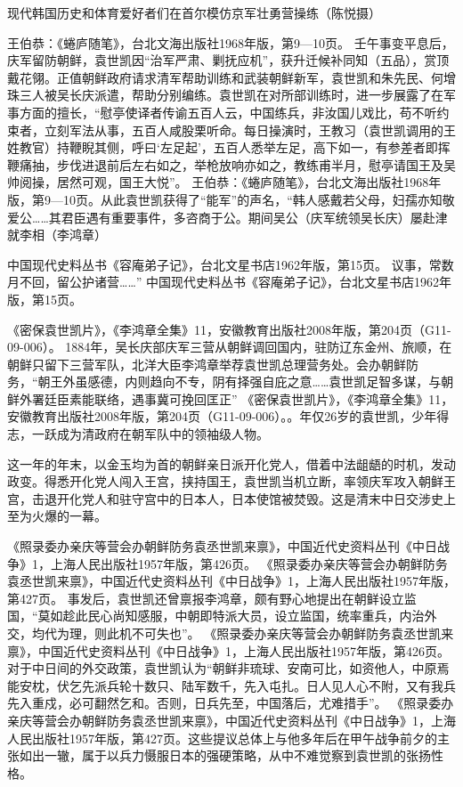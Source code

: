 \documentclass[12pt,UTF8]{ctexbook}
\begin{document}
现代韩国历史和体育爱好者们在首尔模仿京军壮勇营操练（陈悦摄）

王伯恭：《蜷庐随笔》，台北文海出版社1968年版，第9—10页。
壬午事变平息后，庆军留防朝鲜，袁世凯因“治军严肃、剿抚应机”，获升迁候补同知（五品），赏顶戴花翎。正值朝鲜政府请求清军帮助训练和武装朝鲜新军，袁世凯和朱先民、何增珠三人被吴长庆派遣，帮助分别编练。袁世凯在对所部训练时，进一步展露了在军事方面的擅长，“慰亭使译者传谕五百人云，中国练兵，非汝国儿戏比，苟不听约束者，立刻军法从事，五百人咸股栗听命。每日操演时，王教习（袁世凯调用的王姓教官）持鞭睨其侧，呼曰‘左足起’，五百人悉举左足，高下如一，有参差者即挥鞭痛抽，步伐进退前后左右如之，举枪放响亦如之，教练甫半月，慰亭请国王及吴帅阅操，居然可观，国王大悦”。 王伯恭：《蜷庐随笔》，台北文海出版社1968年版，第9—10页。从此袁世凯获得了“能军”的声名，“韩人感戴若父母，妇孺亦知敬爱公……其君臣遇有重要事件，多咨商于公。期间吴公（庆军统领吴长庆）屡赴津就李相（李鸿章）

中国现代史料丛书《容庵弟子记》，台北文星书店1962年版，第15页。
议事，常数月不回，留公护诸营……” 中国现代史料丛书《容庵弟子记》，台北文星书店1962年版，第15页。

《密保袁世凯片》，《李鸿章全集》11，安徽教育出版社2008年版，第204页（G11-09-006）。
1884年，吴长庆部庆军三营从朝鲜调回国内，驻防辽东金州、旅顺，在朝鲜只留下三营军队，北洋大臣李鸿章举荐袁世凯总理营务处。会办朝鲜防务，“朝王外虽感德，内则趋向不专，阴有择强自庇之意……袁世凯足智多谋，与朝鲜外署廷臣素能联络，遇事冀可挽回匡正” 《密保袁世凯片》，《李鸿章全集》11，安徽教育出版社2008年版，第204页（G11-09-006）。。年仅26岁的袁世凯，少年得志，一跃成为清政府在朝军队中的领袖级人物。

这一年的年末，以金玉均为首的朝鲜亲日派开化党人，借着中法龃龉的时机，发动政变。得悉开化党人闯入王宫，挟持国王，袁世凯当机立断，率领庆军攻入朝鲜王宫，击退开化党人和驻守宫中的日本人，日本使馆被焚毁。这是清末中日交涉史上至为火爆的一幕。

《照录委办亲庆等营会办朝鲜防务袁丞世凯来禀》，中国近代史资料丛刊《中日战争》1，上海人民出版社1957年版，第426页。
《照录委办亲庆等营会办朝鲜防务袁丞世凯来禀》，中国近代史资料丛刊《中日战争》1，上海人民出版社1957年版，第427页。
事发后，袁世凯还曾禀报李鸿章，颇有野心地提出在朝鲜设立监国，“莫如趁此民心尚知感服，中朝即特派大员，设立监国，统率重兵，内治外交，均代为理，则此机不可失也”。 《照录委办亲庆等营会办朝鲜防务袁丞世凯来禀》，中国近代史资料丛刊《中日战争》1，上海人民出版社1957年版，第426页。对于中日间的外交政策，袁世凯认为“朝鲜非琉球、安南可比，如资他人，中原焉能安枕，伏乞先派兵轮十数只、陆军数千，先入屯扎。日人见人心不附，又有我兵先入重戍，必可翻然乞和。否则，日兵先至，中国落后，尤难措手”。 《照录委办亲庆等营会办朝鲜防务袁丞世凯来禀》，中国近代史资料丛刊《中日战争》1，上海人民出版社1957年版，第427页。这些提议总体上与他多年后在甲午战争前夕的主张如出一辙，属于以兵力慑服日本的强硬策略，从中不难觉察到袁世凯的张扬性格。
\end{document}
